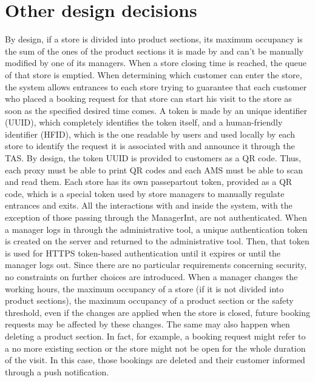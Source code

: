 \documentclass[a4paper,oneside,11pt]{book}
\begin{document}
    \section{Other design decisions}
    \label{section:design_decisions}
    By design, if a store is divided into product sections, its maximum occupancy is the sum of the ones of the product sections it is made by and can’t be manually modified by one of its managers. \newline\newline
    When a store closing time is reached, the queue of that store is emptied. \newline\newline
    When determining which customer can enter the store, the system allows entrances to each store trying to guarantee that each customer who placed a booking request for that store can start his visit to the store as soon as the specified desired time comes. \newline\newline
    A token is made by an unique identifier (UUID), which completely identifies the token itself, and a human-friendly identifier (HFID), which is the one readable by users and used locally by each store to identify the request it is associated with and announce it through the TAS. \newline\newline
    By design, the token UUID is provided to customers as a QR code. Thus, each proxy must be able to print QR codes and each AMS must be able to scan and read them. \newline\newline
    Each store has its own passepartout token, provided as a QR code, which is a special token used by store managers to manually regulate entrances and exits. \newline\newline
    All the interactions with and inside the system, with the exception of those passing through the ManagerInt, are not authenticated. When a manager logs in through the administrative tool, a unique authentication token is created on the server and returned to the administrative tool. Then, that token is used for HTTPS token-based authentication until it expires or until the manager logs out. Since there are no particular requirements concerning security, no constraints on further choices are introduced. \newline\newline
    When a manager changes the working hours, the maximum occupancy of a store (if it is not divided into product sections), the maximum occupancy of a product section or the safety threshold, even if the changes are applied when the store is closed, future booking requests may be affected by these changes. The same may also happen when deleting a product section. In fact, for example, a booking request might refer to a no more existing section or the store might not be open for the whole duration of the visit. In this case, those bookings are deleted and their customer informed through a push notification. \newline\newline
\end{document}
